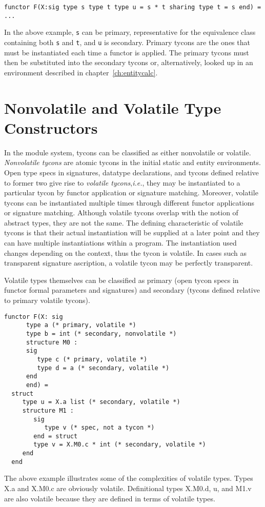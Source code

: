 \begin{lstlisting}
functor F(X:sig type s type t type u = s * t sharing type t = s end) = ...
\end{lstlisting}

	In the above example, \lstinline{s} can be primary, representative for the equivalence class containing both \lstinline{s} and \lstinline{t}, and \lstinline{u} is secondary. Primary tycons are the ones that must be instantiated each time a functor is applied. The primary tycons must then be substituted into the secondary tycons or, alternatively, looked up in an environment described in chapter~\ref{ch:entitycalc}. 
 
\section{Nonvolatile and Volatile Type Constructors}\label{sec:volatile}
In the module system, tycons can be classified as either nonvolatile or volatile. \emph{Nonvolatile tycons} are atomic tycons in the initial static and entity environments. Open type specs in signatures, datatype declarations, and tycons defined relative to former two give rise to \emph{volatile tycons},{\it i.e.}, they may be instantiated to a particular tycon by functor application or signature matching. Moreover, volatile tycons can be instantiated multiple times through different functor applications or signature matching. Although volatile tycons overlap with the notion of abstract types, they are not the same. The defining characteristic of volatile tycons is that their actual instantiation will be supplied at a later point and they can have multiple instantiations within a program. The instantiation used changes depending on the context, thus the tycon is volatile. In cases such as transparent signature ascription, a volatile tycon may be perfectly transparent. 

Volatile types themselves can be classified as primary (open tycon specs in functor formal parameters and signatures) and secondary (tycons defined relative to primary volatile tycons). 

\begin{lstlisting}
functor F(X: sig
      type a (* primary, volatile *)
      type b = int (* secondary, nonvolatile *)
      structure M0 : 
      sig
         type c (* primary, volatile *)
         type d = a (* secondary, volatile *)
      end
      end) =
  struct
     type u = X.a list (* secondary, volatile *)
     structure M1 : 
        sig 
           type v (* spec, not a tycon *)
        end = struct
        type v = X.M0.c * int (* secondary, volatile *)
     end
  end
\end{lstlisting}

The above example illustrates some of the complexities of volatile types. Types X.a and X.M0.c are obviously volatile. Definitional types X.M0.d, u, and M1.v are also volatile because they are defined in terms of volatile types. 

